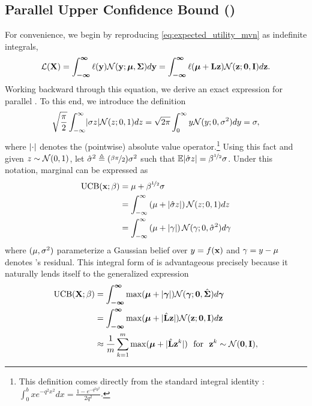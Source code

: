 \newpage
\subsection{Parallel Upper Confidence Bound (\qUCB{})}
\label{appendix:parallel_ucb}
For convenience, we begin by reproducing \eqref{eq:expected_utility_mvn} as indefinite integrals,
\begin{align*}
\mathcal{L}(\mathbf{X}) 
	=\int_{\boldsymbol{-\infty}}^{\boldsymbol{\infty}}
		\ell(\mathbf{y})
		\mathcal{N}(\mathbf{y}; \boldsymbol{\mu}, \boldsymbol{\Sigma})
		d\mathbf{y}
	= \int_{\boldsymbol{-\infty}}^{\boldsymbol{\infty}}
		\ell(\boldsymbol{\mu} + \mathbf{L}\mathbf{z})
		\mathcal{N}(\mathbf{z}; \mathbf{0}, \mathbf{I})
		d\mathbf{z}.
\end{align*}
Working backward through this equation, we derive an exact expression for parallel \UCB{}. To this end, we introduce the definition
\begin{align}
\label{eq:integral_def}
\sqrt{\frac{\pi}{2}}\int_{-\infty}^{\infty}\lvert\sigma z\rvert \mathcal{N}(z; 0, 1)dz 
 	= \sqrt{2\pi}\int_{0}^{\infty} y \mathcal{N}(y; 0, \sigma^{2})dy = \sigma,
\end{align}
where \(\lvert\cdot\rvert\) denotes the (pointwise) absolute value operator.\footnote{This definition comes directly from the standard integral identity \cite{gradshteyn2014table}: \(\int_{0}^{b}xe^{-q^{2}x^{2}}dx = \frac{1 - e^{-q^{2}b^{2}}}{2q^{2}}\).} Using this fact and given \(z \sim \mathcal{N}(0, 1)\), let \(\hat{\sigma}^{2} \triangleq (\nicefrac{\beta\pi}{2})\sigma^{2}\) such that \(\mathbb{E}{\lvert\hat{\sigma}z\rvert} = \beta^{\nicefrac{1}{2}}\sigma\). Under this notation, marginal \UCB{} can be expressed as
\begin{align}
\begin{split}
\operatorname{UCB}(\mathbf{x}; \beta)
	&=\mu + \beta^{\nicefrac{1}{2}}\sigma\\
	&=\int_{-\infty}^{\infty}
    	\left(\mu + \lvert\hat{\sigma} z\rvert\right)
    	\mathcal{N}(z; 0, 1) dz\\
    &= \int_{-\infty}^{\infty}
    	\left(\mu + \lvert\gamma\rvert\right)
    	\mathcal{N}(\gamma; 0, \hat{\sigma}^2)d\gamma
\end{split}
\label{eq:marginal_ucb}
\end{align}
where \((\mu, \sigma^{2})\) parameterize a Gaussian belief over \(y = f(\mathbf{x}{})\) and \(\gamma = y - \mu\) denotes \y{}'s residual. This integral form of \UCB{} is advantageous precisely because it naturally lends itself to the generalized expression
\begin{align}
\begin{split}
\operatorname{UCB}(\mathbf{X}; \beta)
	&= \int_{\boldsymbol{-\infty}}^{\boldsymbol{\infty}}
			\max(\boldsymbol{\mu} + \lvert\boldsymbol{\gamma}\rvert)
			\mathcal{N}(\boldsymbol{\gamma}; \mathbf{0}, \hat{\boldsymbol{\Sigma}})
			d\boldsymbol{\gamma}\\
	&= \int_{\boldsymbol{-\infty}}^{\boldsymbol{\infty}}
			\max(\boldsymbol{\mu} + \lvert\hat{\mathbf{L}}\mathbf{z}\rvert) 
			\mathcal{N}(\mathbf{z}; \mathbf{0}, \mathbf{I})
			d\mathbf{z}\\
	&\approx 
    	\frac{1}{m} \sum^{m}_{k=1} \max(\boldsymbol{\mu} + \lvert\hat{\mathbf{L}}\mathbf{z}^{k}\rvert)
        \text{~~for~~}
        \mathbf{z}^{k} \sim \mathcal{N}(\mathbf{0}, \mathbf{I}),
\end{split}
\label{eq:parallel_ucb}
\end{align}
